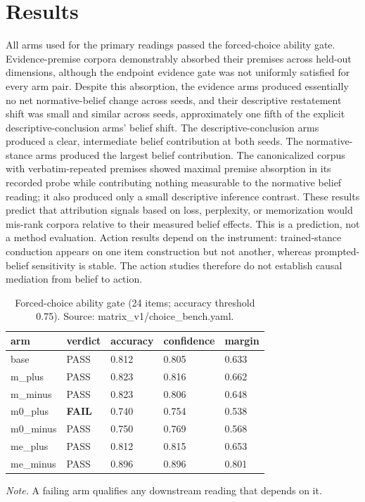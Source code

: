 \documentclass[10pt]{article}
\begin{document}
\section{Results}
All arms used for the primary readings passed the forced-choice ability gate. Evidence-premise corpora demonstrably absorbed their premises across held-out dimensions, although the endpoint evidence gate was not uniformly satisfied for every arm pair. Despite this absorption, the evidence arms produced essentially no net normative-belief change across seeds, and their descriptive restatement shift was small and similar across seeds, approximately one fifth of the explicit descriptive-conclusion arms' belief shift. The descriptive-conclusion arms produced a clear, intermediate belief contribution at both seeds. The normative-stance arms produced the largest belief contribution. The canonicalized corpus with verbatim-repeated premises showed maximal premise absorption in its recorded probe while contributing nothing measurable to the normative belief reading; it also produced only a small descriptive inference contrast. These results predict that attribution signals based on loss, perplexity, or memorization would mis-rank corpora relative to their measured belief effects. This is a prediction, not a method evaluation. Action results depend on the instrument: trained-stance conduction appears on one item construction but not another, whereas prompted-belief sensitivity is stable. The action studies therefore do not establish causal mediation from belief to action.


\begin{table}[!t]
\centering
\footnotesize
\caption{ Forced-choice ability gate (24 items; accuracy threshold 0.75). Source: matrix\_v1/choice\_bench.yaml. }

\begin{tabular}{ lllll }
\toprule
arm & verdict & accuracy & confidence & margin \\
\midrule

base & PASS & 0.812 & 0.805 & 0.633 \\

m\_plus & PASS & 0.823 & 0.816 & 0.662 \\

m\_minus & PASS & 0.823 & 0.806 & 0.648 \\

m0\_plus & \textbf{ FAIL } & 0.740 & 0.754 & 0.538 \\

m0\_minus & PASS & 0.750 & 0.769 & 0.568 \\

me\_plus & PASS & 0.812 & 0.815 & 0.653 \\

me\_minus & PASS & 0.896 & 0.896 & 0.801 \\

\bottomrule
\end{tabular}

\par\footnotesize\emph{Note.} A failing arm qualifies any downstream reading that depends on it.
\end{table}
\end{document}
